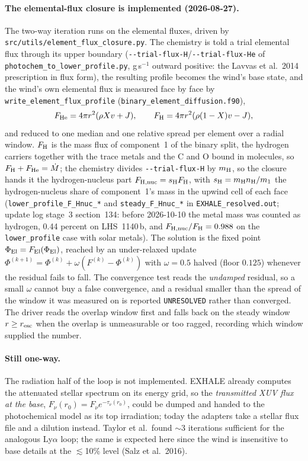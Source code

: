 \documentclass[english,a4paper]{my_memo}
\begin{document}
\paragraph{The elemental-flux closure is implemented (2026-08-27).} The two-way
iteration runs on the elemental fluxes, driven by
\texttt{src/utils/element\_flux\_closure.py}. The chemistry is told a trial
elemental flux through its upper boundary
(\texttt{-{}-trial-flux-H}/\texttt{-{}-trial-flux-He} of
\texttt{photochem\_to\_lower\_profile.py}, g\,s$^{-1}$ outward positive: the
Lavvas et al.\ 2014 prescription in flux form), the resulting profile becomes the
wind's base state, and the wind's own elemental flux is measured face by face by
\texttt{write\_element\_flux\_profile} (\texttt{binary\_element\_diffusion.f90}),
\[
  F_{\rm He}=4\pi r^2(\rho X v + J),\qquad
  F_{\rm H}=4\pi r^2(\rho(1-X)v - J),
\]
and reduced to one median and one relative spread per element over a radial
window. $F_{\rm H}$ is the mass flux of component~1 of the binary split, the
hydrogen carriers together with the trace metals and the C and O bound in
molecules, so $F_{\rm H}+F_{\rm He}=\dot M$; the chemistry divides
\texttt{-{}-trial-flux-H} by $m_{\rm H}$, so the closure hands it the
hydrogen-nucleus part $F_{\rm H,nuc}=s_{\rm H}F_{\rm H}$, with
$s_{\rm H}=m_{\rm H}n_{\rm H}/m_1$ the hydrogen-nucleus share of component~1's
mass in the upwind cell of each face (\texttt{lower\_profile\_F\_Hnuc\_*} and
\texttt{steady\_F\_Hnuc\_*} in \texttt{EXHALE\_resolved.out}; update log
stage~3 section~134: before 2026-10-10 the metal mass was counted as hydrogen,
0.44 percent on LHS~1140\,b, and $F_{\rm H,nuc}/F_{\rm H}=0.988$ on the
\texttt{lower\_profile} case with solar metals). The solution is the fixed point $\Phi_{\rm El}=F_{\rm El}(\Phi_{\rm El})$,
reached by an under-relaxed update $\Phi^{(k+1)}=\Phi^{(k)}+\omega(F^{(k)}-\Phi^{(k)})$
with $\omega=0.5$ halved (floor $0.125$) whenever the residual fails to fall. The
convergence test reads the \emph{undamped} residual, so a small $\omega$ cannot
buy a false convergence, and a residual smaller than the spread of the window it
was measured on is reported \texttt{UNRESOLVED} rather than converged. The driver
reads the overlap window first and falls back on the steady window $r\ge r_{\rm esc}$
when the overlap is unmeasurable or too ragged, recording which window supplied
the number.

\paragraph{Still one-way.} The radiation half of the loop is not implemented.
EXHALE already computes the attenuated stellar spectrum on its energy grid, so the
\emph{transmitted XUV flux at the base}, $F_\nu(r_0)=F_\nu e^{-\tau_\nu(r_0)}$, could be
dumped and handed to the photochemical model as its top irradiation; today the
adapters take a stellar flux file and a dilution instead. Taylor et al.\ found
$\sim$3 iterations sufficient for the analogous Ly$\alpha$ loop; the same is
expected here since the wind is insensitive to base details at the $\lesssim$10\%
level (Salz et al.\ 2016).
\end{document}

